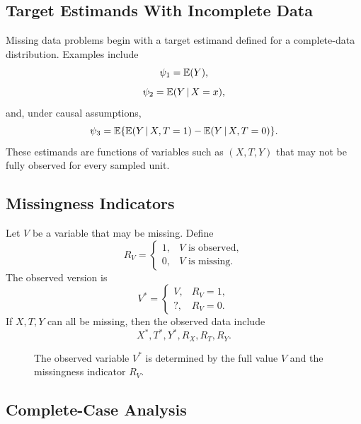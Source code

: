 \label{lec:9-8}

\subsection{Target Estimands With Incomplete Data}

Missing data problems begin with a target estimand defined for a complete-data
distribution. Examples include
\[
  \psi_1=\mathbb{E}(Y),
\]
\[
  \psi_2=\mathbb{E}(Y\,\vert\, X=x),
\]
and, under causal assumptions,
\[
  \psi_3=\mathbb{E}\{\mathbb{E}(Y\,\vert\, X,T=1)-\mathbb{E}(Y\,\vert\, X,T=0)\}.
\]
These estimands are functions of variables such as $(X,T,Y)$ that may not be
fully observed for every sampled unit.

\subsection{Missingness Indicators}

Let $V$ be a variable that may be missing. Define
\[
  R_V=
  \begin{cases}
  1, & V \text{ is observed},\\
  0, & V \text{ is missing}.
  \end{cases}
\]
The observed version is
\[
  V^*=
  \begin{cases}
  V, & R_V=1,\\
  ?, & R_V=0.
  \end{cases}
\]
If $X,T,Y$ can all be missing, then the observed data include
\[
  X^*,T^*,Y^*,R_X,R_T,R_Y.
\]

\begin{figure}[H]
\centering
{}
\caption{The observed variable $V^*$ is determined by the full value $V$ and the missingness indicator $R_V$.}
\label{fig:ch9-missing-indicator}
\end{figure}

\subsection{Complete-Case Analysis}

